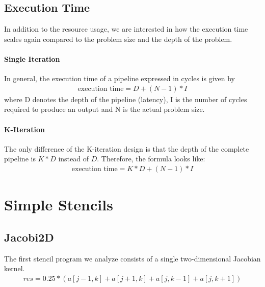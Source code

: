 \subsection{Execution Time}
In addition to the resource usage, we are interested in how the execution time scales again compared to the problem size and the depth of the problem. 


\paragraph{Single Iteration}
In general, the execution time of a pipeline expressed in cycles is given by
\begin{align}
	\text{execution time} = D + (N-1)*I
\end{align}
where D denotes the depth of the pipeline (latency), I is the number of cycles required to produce an output and N is the actual problem size.


\paragraph{K-Iteration}

The only difference of the K-iteration design is that the depth of the complete pipeline is $K*D$ instead of $D$. Therefore, the formula looks like:
\begin{align}
\text{execution time} = K*D + (N-1)*I
\end{align}



\section{Simple Stencils} 



\subsection{Jacobi2D} 
The first stencil program we analyze consists of a single two-dimensional Jacobian kernel.
\begin{align}    
res = 0.25 * (a[j-1,k] + a[j+1,k] + a[j,k-1] + a[j,k+1])
\end{align}



